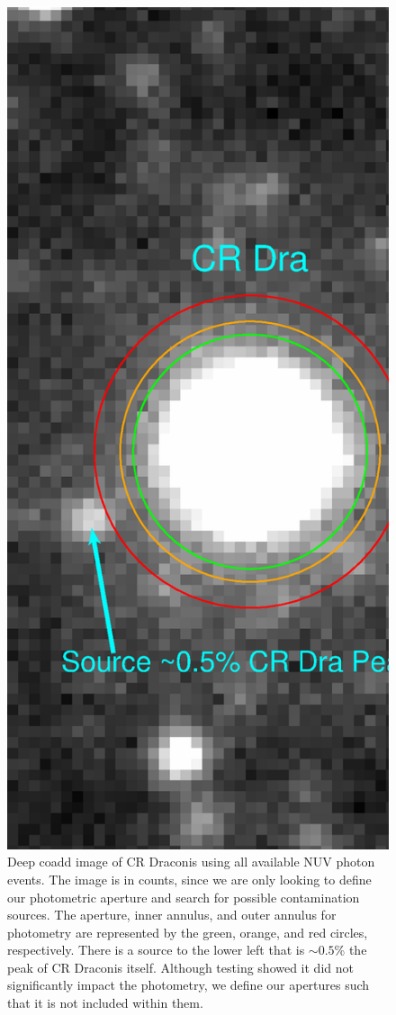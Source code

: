 \documentclass[preprint]{aastex}
\begin{document}
\clearpage

\begin{figure}
\includegraphics[scale=0.375]{Fig20.eps}
\caption{Deep coadd image of CR Draconis using all available NUV photon events. The image is in counts, since we are only looking to define our photometric aperture and search for possible contamination sources. The aperture, inner annulus, and outer annulus for photometry are represented by the green, orange, and red circles, respectively.  There is a source to the lower left that is $\sim 0.5$\% the peak of CR Draconis itself. Although testing showed it did not significantly impact the photometry, we define our apertures such that it is not included within them.\label{crdracoadd}}
\end{figure}
\end{document}
